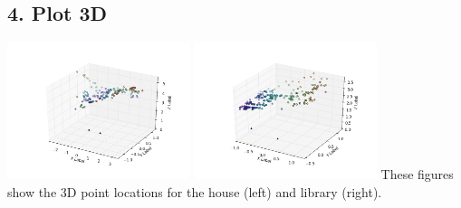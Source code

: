 \documentclass{article}\usepackage{amsmath,amssymb,amsthm,tikz,tkz-graph,color,chngpage,soul,hyperref,csquotes,graphicx,floatrow}\newcommand*{\QEDB}{\hfill\ensuremath{\square}}\newtheorem*{prop}{Proposition}\renewcommand{\theenumi}{\alph{enumi}}\usepackage[shortlabels]{enumitem}\usepackage[nobreak=true]{mdframed}\usetikzlibrary{matrix,calc}\MakeOuterQuote{"}\usepackage[margin=0.95in]{geometry} \newtheorem{theorem}{Theorem}
\begin{document}
\subsection*{4. Plot 3D}

\begin{mdframed}


\includegraphics[width=0.4\textwidth]{house.png}
\includegraphics[width=0.4\textwidth]{library.png}
These figures show the 3D point locations for the house (left) and library (right). 


\end{mdframed}
\end{document}
